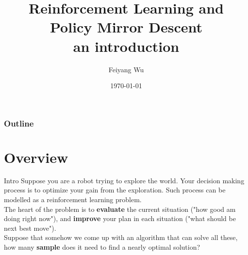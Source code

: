 \documentclass[handout]{beamer}
\title[PMD]{%
    Reinforcement Learning and \\Policy Mirror Descent\\ an introduction
    \vspace{0.5cm}
}
\author{Feiyang Wu}
\institute{
        \textit{College of Computing, School of Computer Science}\\
        \textit{Georgia Institute of Technology}
        \vspace{0.5cm}
}
\date[\today]{
    \today
}
\begin{document}
{
    \maketitle
}

\begin{frame}
\frametitle{Outline}
\tableofcontents
\end{frame}

\section{Overview}
\begin{frame}{Intro}
    \small
    Suppose you are a robot trying to explore the world. Your decision making process is to optimize your gain from the exploration. Such process can be modelled as a reinforcement learning problem. \\ \vspace{0.5cm}
    The heart of the problem is to \textbf{evaluate} the current situation ("how good am doing right now"), and \textbf{improve} your plan in each situation ("what should be next best move").\\ \vspace{0.5cm}
    Suppose that somehow we come up with an algorithm that can solve all these, how many \textbf{sample} does it need to find a nearly optimal solution?
\end{frame}
\end{document}
